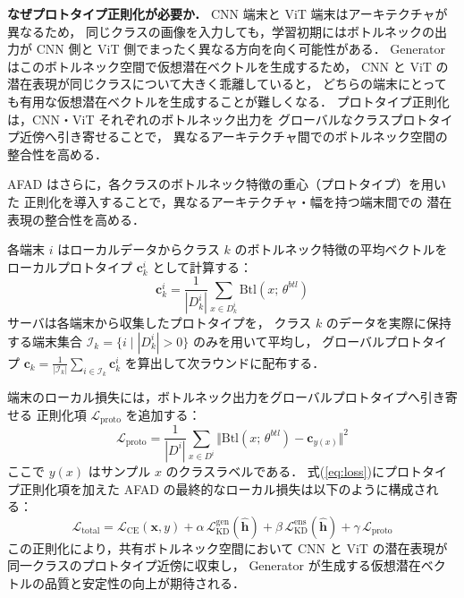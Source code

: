 \textbf{なぜプロトタイプ正則化が必要か．}
CNN 端末と ViT 端末はアーキテクチャが異なるため，
同じクラスの画像を入力しても，学習初期にはボトルネックの出力が
CNN 側と ViT 側でまったく異なる方向を向く可能性がある．
Generator はこのボトルネック空間で仮想潜在ベクトルを生成するため，
CNN と ViT の潜在表現が同じクラスについて大きく乖離していると，
どちらの端末にとっても有用な仮想潜在ベクトルを生成することが難しくなる．
プロトタイプ正則化は，CNN・ViT それぞれのボトルネック出力を
グローバルなクラスプロトタイプ近傍へ引き寄せることで，
異なるアーキテクチャ間でのボトルネック空間の整合性を高める．

AFAD はさらに，各クラスのボトルネック特徴の重心（プロトタイプ）を用いた
正則化を導入することで，異なるアーキテクチャ・幅を持つ端末間での
潜在表現の整合性を高める．

各端末 $i$ はローカルデータからクラス $k$ のボトルネック特徴の平均ベクトルを
ローカルプロトタイプ $\mathbf{c}_k^i$ として計算する：
\begin{equation}
  \mathbf{c}_k^i = \frac{1}{|D_k^i|} \sum_{x \in D_k^i} \mathrm{Btl}(x;\,\theta^{btl})
  \label{eq:prototype}
\end{equation}
サーバは各端末から収集したプロトタイプを，
クラス $k$ のデータを実際に保持する端末集合 $\mathcal{I}_k = \{i \mid |D_k^i| > 0\}$ のみを用いて平均し，
グローバルプロトタイプ $\mathbf{c}_k = \frac{1}{|\mathcal{I}_k|}\sum_{i \in \mathcal{I}_k}\mathbf{c}_k^i$
を算出して次ラウンドに配布する．

端末のローカル損失には，ボトルネック出力をグローバルプロトタイプへ引き寄せる
正則化項 $\mathcal{L}_{\mathrm{proto}}$ を追加する：
\begin{equation}
  \mathcal{L}_{\mathrm{proto}} = \frac{1}{|D^i|}
    \sum_{x \in D^i} \bigl\Vert \mathrm{Btl}(x;\,\theta^{btl}) - \mathbf{c}_{y(x)} \bigr\Vert^2
  \label{eq:proto_loss}
\end{equation}
ここで $y(x)$ はサンプル $x$ のクラスラベルである．
式(\ref{eq:loss})にプロトタイプ正則化項を加えた
AFAD の最終的なローカル損失は以下のように構成される：
\begin{equation}
  \mathcal{L}_{\mathrm{total}} = \mathcal{L}_{\mathrm{CE}}(\mathbf{x}, y)
    + \alpha \, \mathcal{L}_{\mathrm{KD}}^{\mathrm{gen}}(\hat{\mathbf{h}})
    + \beta  \, \mathcal{L}_{\mathrm{KD}}^{\mathrm{ens}}(\hat{\mathbf{h}})
    + \gamma \, \mathcal{L}_{\mathrm{proto}}
  \label{eq:loss_total}
\end{equation}
この正則化により，共有ボトルネック空間において
CNN と ViT の潜在表現が同一クラスのプロトタイプ近傍に収束し，
Generator が生成する仮想潜在ベクトルの品質と安定性の向上が期待される．

